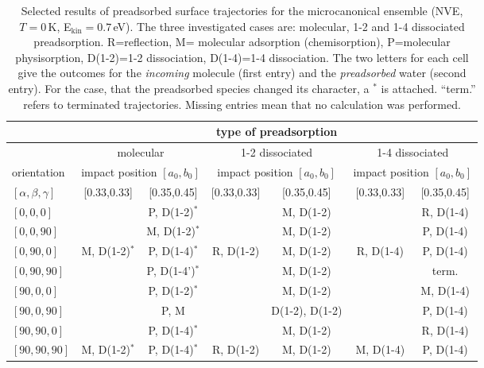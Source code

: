 \documentclass[11pt,DIV=13,BCOR=5mm,a4paper,headinclude]{scrbook}
\begin{document}
\begin{table}[!h]
  \centering
  \caption{Selected results of preadsorbed surface trajectories for the microcanonical ensemble (NVE, $T=0\,$K, E$_\textrm{kin}=0.7\,$eV).
The three investigated cases are: molecular, 1-2 and 1-4 dissociated preadsorption.
R=reflection, M= molecular adsorption (chemisorption), P=molecular physisorption, D(1-2)=1-2 dissociation, D(1-4)=1-4 dissociation.
The two letters for each cell give the outcomes for the \textit{incoming} molecule (first entry) and the \textit{preadsorbed} water (second entry).
For the case, that the preadsorbed species changed its character, a $^*$ is attached.
``term.'' refers to terminated trajectories.
Missing entries mean that no calculation was performed.}
\hspace*{-1cm}
 \begin{tabular}{l|cc|cc|cc}
 \toprule
               & \multicolumn{6}{c}{type of preadsorption } \\\hline
               & \multicolumn{2}{c|}{molecular} & \multicolumn{2}{c|}{1-2 dissociated} & \multicolumn{2}{c}{1-4 dissociated} \\\hline
    orientation& \multicolumn{2}{c|}{impact position $[a_0,b_0]$} & \multicolumn{2}{c|}{impact position $[a_0,b_0]$} & \multicolumn{2}{c}{impact position $[a_0,b_0]$} \\
    $[\alpha,\beta,\gamma]$ & [0.33,0.33] & [0.35,0.45] & [0.33,0.33] & [0.35,0.45] & [0.33,0.33] & [0.35,0.45] \\
    \midrule
   $[0,0,0]$    &          & P, D(1-2)$^*$  &  & M, D(1-2) &  & R, D(1-4) \\
   $[0,0,90]$   &          & M, D(1-2)$^*$  &  & M, D(1-2) &  & P, D(1-4) \\
   $[0,90,0]$   & M, D(1-2)$^*$ & P, D(1-4)$^*$  & R, D(1-2) & M, D(1-2) & R, D(1-4) & P, D(1-4) \\
   $[0,90,90]$  &          & P, D(1-4')$^*$ &  & M, D(1-2) &          & term. \\
   $[90,0,0]$   &          & P, D(1-2)$^*$  &  & M, D(1-2) &  & M, D(1-4) \\
   $[90,0,90]$  &          & P, M      &  & D(1-2), D(1-2) &  & P, D(1-4) \\
   $[90,90,0]$  &          & P, D(1-4)$^*$  &  & M, D(1-2) &  & R, D(1-4) \\
   $[90,90,90]$ & M, D(1-2)$^*$ & P, D(1-4)$^*$  & R, D(1-2) & M, D(1-2) & M, D(1-4) & P, D(1-4)
\\\hline
  \end{tabular}
  \label{tab:preads_mic}
\end{table}
\end{document}

